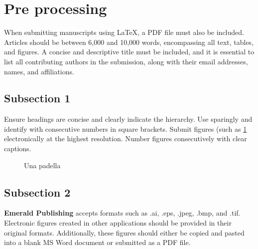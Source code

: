 \section{Pre processing}
\label{sec:pre-proc}


When submitting manuscripts using \LaTeX, a PDF file must also be included. 
Articles should be between 6,000 and 10,000 words, encompassing all text, tables, and figures. 
A concise and descriptive title must be included, and it is essential to list all contributing authors in the submission, along with their email addresses, names, and affiliations.

\subsection{Subsection 1}
Ensure headings are concise and clearly indicate the hierarchy. 
Use sparingly and identify with consecutive numbers in square brackets.
Submit figures (such as \cref{fig-1} electronically at the highest resolution. Number figures consecutively with clear captions.

\begin{figure}[ht]
 \centering
 \caption{Una padella}
 \label{fig-1}
\end{figure}

\subsection{Subsection 2}
\textbf{Emerald Publishing} accepts formats such as .ai, .eps, .jpeg, .bmp, and .tif. Electronic figures created in other applications should be provided in their original formats. 
Additionally, these figures should either be copied and pasted into a blank MS Word document or submitted as a PDF file.